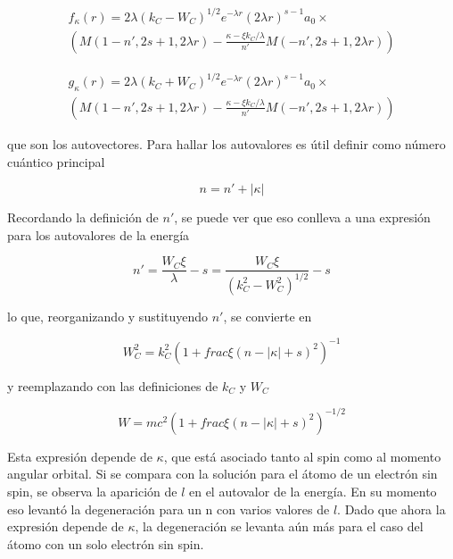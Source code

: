 \documentclass[a4paper, 12pt]{article} %
\begin{document}
\begin{equation}
\begin{split}
f_{\kappa}(r)=2\lambda (k_C -W_C)^{1/2}e^{-\lambda r}(2\lambda r)^{s-1}a_0 \times \\
\left( M(1-n',2s+1,2\lambda r) - \frac{\kappa-\xi k_C /\lambda}{n'} M(-n',2s+1,2\lambda r) \right)
\end{split}
\end{equation}

\begin{equation}
\begin{split}
g_{\kappa}(r)=2\lambda (k_C +W_C)^{1/2}e^{-\lambda r}(2\lambda r)^{s-1}a_0 \times \\
\left( M(1-n',2s+1,2\lambda r) - \frac{\kappa-\xi k_C /\lambda}{n'} M(-n',2s+1,2\lambda r) \right)
\end{split}
\end{equation}

que son los autovectores. Para hallar los autovalores es \'util definir como n\'umero cu\'antico principal 

\begin{equation}
n=n'+|\kappa|
\end{equation}

Recordando la definici\'on de $n'$, se puede ver que eso conlleva a una expresi\'on para los autovalores de la energ\'ia

\begin{equation}
n'= \frac{W_C \xi}{\lambda}-s=\frac{W_C \xi}{(k^2_{C}-W^2_{C})^{1/2}}-s
\end{equation}

lo que, reorganizando y sustituyendo $n'$, se convierte en

\begin{equation}
W^2_C = k^2_C \left(1+frac{\xi}{(n-|\kappa|+s)^2} \right)^{-1}
\end{equation}

y reemplazando con las definiciones de $k_C$ y $W_C$

\begin{equation}\label{eq:enerW}
W = mc^2 \left(1+frac{\xi}{(n-|\kappa|+s)^2} \right)^{-1/2}
\end{equation}

Esta expresi\'on depende de $\kappa$, que est\'a asociado tanto al spin como al momento angular orbital. Si se compara con la soluci\'on para el \'atomo de un electr\'on sin spin, se observa la aparici\'on de $l$ en el autovalor de la energ\'ia. En su momento eso levant\'o la degeneraci\'on para un n con varios valores de $l$. Dado que ahora la expresi\'on depende de $\kappa$, la degeneraci\'on se levanta a\'un m\'as para el caso del \'atomo con un solo electr\'on sin spin.
\end{document}
